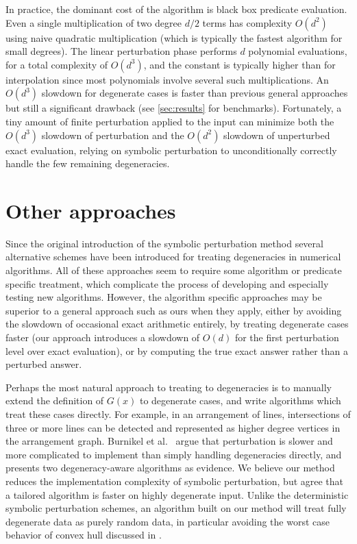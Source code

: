 \documentclass[11pt]{article}
\begin{document}
In practice, the dominant cost of the algorithm is black box predicate evaluation.  Even a single multiplication of two degree $d/2$ terms has complexity $O(d^2)$ using naive
quadratic multiplication (which is typically the fastest algorithm for small degrees).  The linear perturbation phase performs $d$ polynomial evaluations, for a total
complexity of $O(d^3)$, and the constant is typically higher than for interpolation since most polynomials involve several such multiplications.  An $O(d^3)$ slowdown for degenerate
cases is faster than previous general approaches but still a significant drawback (see \autoref{sec:results} for benchmarks).  Fortunately, a tiny amount of finite perturbation
applied to the input can minimize both the $O(d^3)$ slowdown of perturbation and the $O(d^2)$ slowdown of unperturbed exact evaluation, relying on symbolic perturbation to
unconditionally correctly handle the few remaining degeneracies.

\section{Other approaches}

Since the original introduction of the symbolic perturbation method several alternative schemes have been introduced for treating degeneracies in numerical algorithms.
All of these approaches seem to require some algorithm or predicate specific treatment, which complicate the process of developing and especially testing new algorithms.
However, the algorithm specific approaches may be superior to a general approach such as ours when they apply, either by avoiding the slowdown of occasional exact arithmetic
entirely, by treating degenerate cases faster (our approach introduces a slowdown of $O(d)$ for the first perturbation level over exact evaluation), or by computing the true exact
answer rather than a perturbed answer.

Perhaps the most natural approach to treating to degeneracies is to manually extend the definition of $G(x)$ to degenerate cases, and write algorithms which treat these cases
directly.  For example, in an arrangement of lines, intersections of three or more lines can be detected and represented as higher degree vertices in the arrangement graph.
Burnikel et al.\ \cite{burnikel1994degeneracy} argue that perturbation is slower and more complicated to implement than simply handling degeneracies directly, and presents two degeneracy-aware
algorithms as evidence.  We believe our method reduces the implementation complexity of symbolic perturbation, but agree that a tailored algorithm is faster on highly
degenerate input.  Unlike the deterministic symbolic perturbation schemes, an algorithm built on our method will treat fully degenerate data as purely random data, in particular
avoiding the worst case behavior of convex hull discussed in \cite{burnikel1994degeneracy}.
\end{document}
